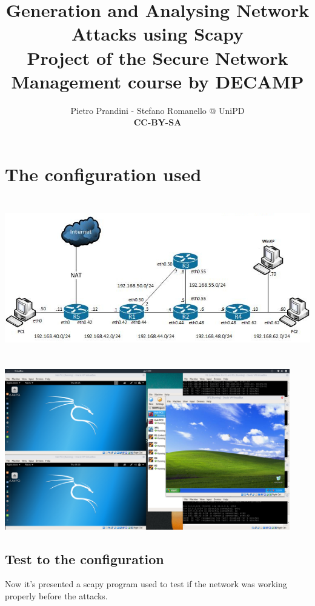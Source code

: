 \documentclass[10pt,a4paper]{article}
\author{Pietro Prandini - Stefano Romanello @ UniPD\\{\textbf{\tiny{CC-BY-SA}}}}
\title{Generation and Analysing Network Attacks using Scapy\\{\small{Project of the Secure Network Management course by DECAMP}}}
\begin{document}
\maketitle %

\section{The configuration used}
\begin{center}
\includegraphics[height=7cm]{img/NetworkConfiguration.jpg}\par
\includegraphics[height=7cm]{img/GlobalConfiguration.png}\par
\end{center}



\subsection{Test to the configuration}
Now it's presented a scapy program used to test if the network was working properly before the attacks.\par

\end{document}
